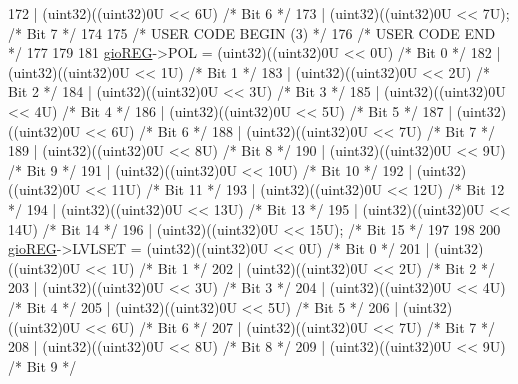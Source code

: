 \begin{DoxyCode}
172                       | (uint32)((uint32)0U << 6U)  \textcolor{comment}{/* Bit 6 */}
173                       | (uint32)((uint32)0U << 7U); \textcolor{comment}{/* Bit 7 */}
174 
175 \textcolor{comment}{/* USER CODE BEGIN (3) */}
176 \textcolor{comment}{/* USER CODE END */}
177 
179 
181     \mbox{\hyperlink{reg__gio_8h_acf3fc7487b247fa20e47f99b3551b8dd}{gioREG}}->POL = (uint32)((uint32)0U << 0U)   \textcolor{comment}{/* Bit 0 */}
182                 | (uint32)((uint32)0U << 1U)   \textcolor{comment}{/* Bit 1 */}
183                 | (uint32)((uint32)0U << 2U)   \textcolor{comment}{/* Bit 2 */}
184                 | (uint32)((uint32)0U << 3U)   \textcolor{comment}{/* Bit 3 */}
185                 | (uint32)((uint32)0U << 4U)   \textcolor{comment}{/* Bit 4 */}
186                 | (uint32)((uint32)0U << 5U)   \textcolor{comment}{/* Bit 5 */}
187                 | (uint32)((uint32)0U << 6U)   \textcolor{comment}{/* Bit 6 */}
188                 | (uint32)((uint32)0U << 7U)   \textcolor{comment}{/* Bit 7 */}
189                 | (uint32)((uint32)0U << 8U)   \textcolor{comment}{/* Bit 8  */}
190                 | (uint32)((uint32)0U << 9U)   \textcolor{comment}{/* Bit 9  */}
191                 | (uint32)((uint32)0U << 10U)  \textcolor{comment}{/* Bit 10 */}
192                 | (uint32)((uint32)0U << 11U)  \textcolor{comment}{/* Bit 11 */}
193                 | (uint32)((uint32)0U << 12U)  \textcolor{comment}{/* Bit 12 */}
194                 | (uint32)((uint32)0U << 13U)  \textcolor{comment}{/* Bit 13 */}
195                 | (uint32)((uint32)0U << 14U)  \textcolor{comment}{/* Bit 14 */}
196                 | (uint32)((uint32)0U << 15U); \textcolor{comment}{/* Bit 15 */}
197 
198 
200     \mbox{\hyperlink{reg__gio_8h_acf3fc7487b247fa20e47f99b3551b8dd}{gioREG}}->LVLSET = (uint32)((uint32)0U << 0U)   \textcolor{comment}{/* Bit 0 */}
201                    | (uint32)((uint32)0U << 1U)   \textcolor{comment}{/* Bit 1 */}
202                    | (uint32)((uint32)0U << 2U)   \textcolor{comment}{/* Bit 2 */}
203                    | (uint32)((uint32)0U << 3U)   \textcolor{comment}{/* Bit 3 */}
204                    | (uint32)((uint32)0U << 4U)   \textcolor{comment}{/* Bit 4 */}
205                    | (uint32)((uint32)0U << 5U)   \textcolor{comment}{/* Bit 5 */}
206                    | (uint32)((uint32)0U << 6U)   \textcolor{comment}{/* Bit 6 */}
207                    | (uint32)((uint32)0U << 7U)   \textcolor{comment}{/* Bit 7 */}
208                    | (uint32)((uint32)0U << 8U)   \textcolor{comment}{/* Bit 8  */}
209                    | (uint32)((uint32)0U << 9U)   \textcolor{comment}{/* Bit 9  */}

\end{DoxyCode}
